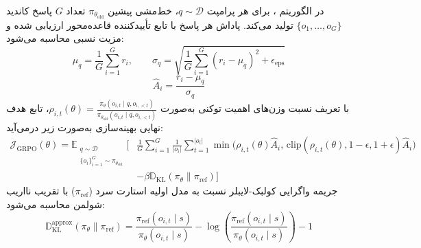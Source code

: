 در الگوریتم ، برای هر پرامپت $q \sim \mathcal{D}$، خط‌مشی پیشین $\pi_{\theta_{\text{old}}}$ تعداد $G$ پاسخ کاندید $\{o_1, \dots, o_G\}$ تولید می‌کند. پاداش هر پاسخ با تابع تأییدکننده قاعده‌محور ارزیابی شده و مزیت نسبی محاسبه می‌شود:
\begin{equation}
    \mu_q = \frac{1}{G} \sum_{i=1}^G r_i, \qquad \sigma_q = \sqrt{\frac{1}{G} \sum_{i=1}^G (r_i - \mu_q)^2 + \epsilon_{\text{eps}}}
\end{equation}
\begin{equation}
    \hat{A}_i = \frac{r_i - \mu_q}{\sigma_q}
\end{equation}
با تعریف نسبت وزن‌های اهمیت توکنی به‌صورت $\rho_{i,t}(\theta) = \frac{\pi_\theta(o_{i,t} \mid q, o_{i,<t})}{\pi_{\theta_{\text{old}}}(o_{i,t} \mid q, o_{i,<t})}$، تابع هدف نهایی بهینه‌سازی به‌صورت زیر درمی‌آید:
\begin{equation}
\begin{aligned}
    \mathcal{J}_{\text{GRPO}}(\theta) = \mathbb{E}_{\substack{q \sim \mathcal{D} \\ \{o_i\}_{i=1}^G \sim \pi_{\theta_{\text{old}}}}} \Bigg[ & \frac{1}{G} \sum_{i=1}^G \frac{1}{|o_i|} \sum_{t=1}^{|o_i|} \min \Big( \rho_{i,t}(\theta) \hat{A}_i, \, \text{clip}(\rho_{i,t}(\theta), 1-\epsilon, 1+\epsilon) \hat{A}_i \Big) \\
    & - \beta \mathbb{D}_{\text{KL}}(\pi_\theta \parallel \pi_{\text{ref}}) \Bigg]
\end{aligned}
\end{equation}
جریمه واگرایی کولبک-لایبلر نسبت به مدل اولیه استارت سرد ($\pi_{\text{ref}}$) با تقریب نااریب شولمن \cite{schulman2020kl} محاسبه می‌شود:
\begin{equation}
    \mathbb{D}_{\text{KL}}^{\text{approx}}(\pi_\theta \parallel \pi_{\text{ref}}) = \frac{\pi_{\text{ref}}(o_{i,t} \mid s)}{\pi_\theta(o_{i,t} \mid s)} - \log \left( \frac{\pi_{\text{ref}}(o_{i,t} \mid s)}{\pi_\theta(o_{i,t} \mid s)} \right) - 1
\end{equation}

